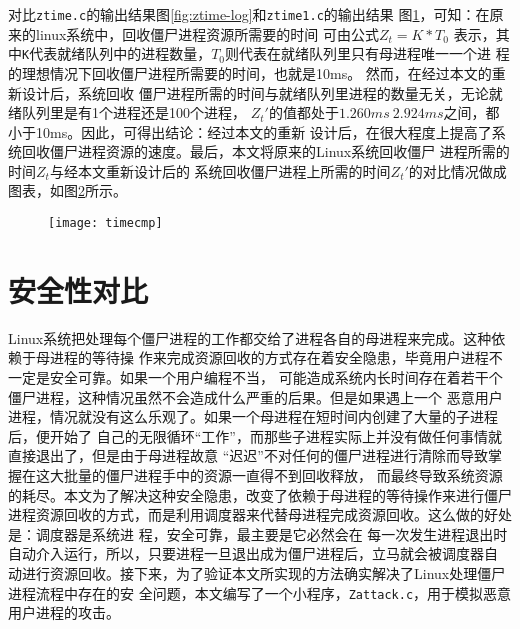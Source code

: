 \documentclass{swfuthesism}
\begin{document}
\begin{figure}
  \centering
  \label{fig:ztime1-log}    
\end{figure}

对比\texttt{ztime.c}的输出结果图\ref{fig:ztime-log}和\texttt{ztime1.c}的输出结果
图\ref{fig:ztime1-log}，可知：在原来的linux系统中，回收僵尸进程资源所需要的时间
可由公式$Z_t=K*T_0$ 表示，其中\texttt{K}代表就绪队列中的进程数量，$T_0$则代表在就绪队列里只有母进程唯一一个进
程的理想情况下回收僵尸进程所需要的时间，也就是10ms。
然而，在经过本文的重新设计后，系统回收
僵尸进程所需的时间与就绪队列里进程的数量无关，无论就绪队列里是有1个进程还是100个进程，
$Z_t'$的值都处于$1.260ms~2.924ms$之间，都小于10ms。因此，可得出结论：经过本文的重新
设计后，在很大程度上提高了系统回收僵尸进程资源的速度。最后，本文将原来的Linux系统回收僵尸
进程所需的时间$Z_t$与经本文重新设计后的
系统回收僵尸进程上所需的时间$Z_t'$的对比情况做成图表，如图\ref{fig:timecmp}所示。    

\begin{figure}
  \centering
  \texttt{[image: timecmp]}
  \label{fig:timecmp}
\end{figure}

\section{安全性对比}

Linux系统把处理每个僵尸进程的工作都交给了进程各自的母进程来完成。这种依赖于母进程的等待操
作来完成资源回收的方式存在着安全隐患，毕竟用户进程不一定是安全可靠。如果一个用户编程不当，
可能造成系统内长时间存在着若干个僵尸进程，这种情况虽然不会造成什么严重的后果。但是如果遇上一个
恶意用户进程，情况就没有这么乐观了。如果一个母进程在短时间内创建了大量的子进程后，便开始了
自己的无限循环“工作”，而那些子进程实际上并没有做任何事情就直接退出了，但是由于母进程故意
“迟迟”不对任何的僵尸进程进行清除而导致掌握在这大批量的僵尸进程手中的资源一直得不到回收释放，
而最终导致系统资源的耗尽。本文为了解决这种安全隐患，改变了依赖于母进程的等待操作来进行僵尸
进程资源回收的方式，而是利用调度器来代替母进程完成资源回收。这么做的好处是：调度器是系统进
程，安全可靠，最主要是它必然会在
每一次发生进程退出时自动介入运行，所以，只要进程一旦退出成为僵尸进程后，立马就会被调度器自
动进行资源回收。接下来，为了验证本文所实现的方法确实解决了Linux处理僵尸进程流程中存在的安
全问题，本文编写了一个小程序，\texttt{Zattack.c}，用于模拟恶意用户进程的攻击。
\end{document}
